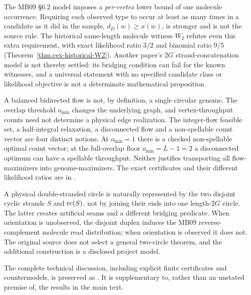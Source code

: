 \begin{remark}
\label{rem:surfaces}
The MB09 §6.2 model imposes a \emph{per-vertex} lower bound of one
molecule occurrence. Requiring each observed type to occur at least
as many times in a candidate as it did in the sample,
$d_D(w)\ge x(w)$, is stronger and is not the source rule.
The historical same-length molecule witness $W_2$ refutes even this
extra requirement, with exact likelihood ratio $3/2$ and binomial
ratio $9/5$ (Theorem~\ref{thm:cex-historical-W2}). Another paper's
$2G$ strand-concatenation model is not thereby settled: its bridging
condition can fail for the known witnesses, and a universal
statement with no specified candidate class or likelihood objective
is not a determinate mathematical proposition.
\end{remark}

\begin{remark}
\label{rem:flow-domain}
A balanced bidirected flow is not, by definition, a single circular
genome. The overlap threshold $o_{\min}$ changes the underlying
graph, and vertex-throughput counts need not determine a physical
edge realization. The integer-flow feasible set, a half-integral
relaxation, a disconnected flow and a non-spellable count vector are
four distinct notions. At $o_{\min}=1$ there is a checked
non-spellable optimal count vector; at the full-overlap floor
$o_{\min}=L-1=2$ a disconnected optimum can have a spellable
throughput. Neither justifies transporting all flow-maximizers into
genome-maximizers. The exact certificates and their different
likelihood ratios are in .
\end{remark}

\begin{remark}
\label{rem:duplex}
A physical double-stranded circle is naturally represented by the
two disjoint cyclic strands $S$ and $\operatorname{rc}(S)$, not by joining their
ends into one length-$2G$ circle. The latter creates artificial seams
and a different bridging predicate. When orientation is unobserved,
the disjoint duplex induces the MB09 reverse-complement molecule
read distribution; when orientation is observed it does not.
The original source does not select a general two-circle theorem,
and the additional construction is a disclosed project model.
\end{remark}

The complete technical discussion, including explicit finite
certificates and countermodels, is preserved as
.
It is supplementary to, rather than an unstated premise of,
the results in the main text.
